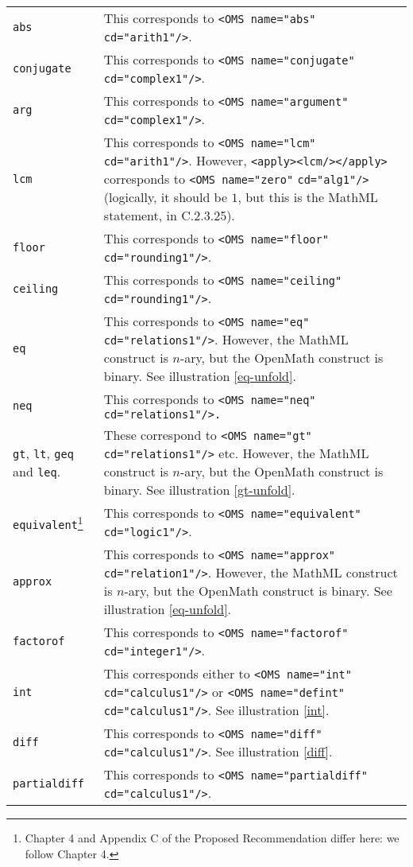 \documentclass[twoside,11pt]{article}
\begin{document}
\begin{longtable}{
        >{\raggedright\let\\=\tabularnewline}p{2in}
        >{\raggedright\let\\=\tabularnewline}p{3in}}
\verb+abs+&This corresponds to \verb+<OMS name="abs"+ \verb+cd="arith1"/>+.\\
\verb+conjugate+&This corresponds to
\verb+<OMS name="conjugate"+ \verb+cd="complex1"/>+.\\
\verb+arg+&This corresponds to \verb+<OMS name="argument"+
\verb+cd="complex1"/>+.\\
\verb+lcm+&This corresponds to
\verb+<OMS name="lcm"+ \verb+cd="arith1"/>+. However,
\verb+<apply><lcm/></apply>+ corresponds to 
\verb+<OMS name="zero"+ \verb+cd="alg1"/>+ (logically, it should be
$1$, but this is the MathML statement, in C.2.3.25).\\
\verb+floor+&This corresponds to \verb+<OMS name="floor"+ 
\verb+cd="rounding1"/>+.\\
\verb+ceiling+&This corresponds to \verb+<OMS name="ceiling"+ 
\verb+cd="rounding1"/>+.\\
\verb+eq+&This corresponds to 
\verb+<OMS name="eq"+ \verb+cd="relations1"/>+. However, the MathML construct 
is $n$-ary, but the OpenMath construct is binary. See illustration
\ref{eq-unfold}.\\
\verb+neq+&This corresponds to
\verb+<OMS name="neq"+ \verb+cd="relations1"/>.+\\
\verb+gt+, \verb+lt+, \verb+geq+ and \verb+leq+.&These correspond to
\verb+<OMS name="gt"+ \verb+cd="relations1"/>+ etc. However, the MathML construct 
is $n$-ary, but the OpenMath construct is binary. See illustration
\ref{gt-unfold}.\\
\verb+equivalent+\footnote{Chapter 4 and Appendix C of the Proposed
Recommendation differ here: we follow Chapter 4.}&This corresponds to
\verb+<OMS name="equivalent"+ \verb+cd="logic1"/>+.\\
\verb+approx+&This corresponds to
\verb+<OMS name="approx"+ \verb+cd="relation1"/>+. However, the MathML 
construct is $n$-ary, but the OpenMath construct is binary. See illustration
\ref{eq-unfold}.\\
\verb+factorof+&This corresponds to \verb+<OMS name="factorof"+ 
\verb+cd="integer1"/>+.\\
\verb+int+&This corresponds either to 
\verb+<OMS name="int"+ \verb+cd="calculus1"/>+ or
\verb+<OMS name="defint"+ \verb+cd="calculus1"/>+. See illustration
\ref{int}.\\
\verb+diff+&This corresponds to \verb+<OMS name="diff"+ \verb+cd="calculus1"/>+.
See illustration \ref{diff}.\\
\verb+partialdiff+&This corresponds to 
\verb+<OMS name="partialdiff"+ \verb+cd="calculus1"/>+.

\end{longtable}
\end{document}
